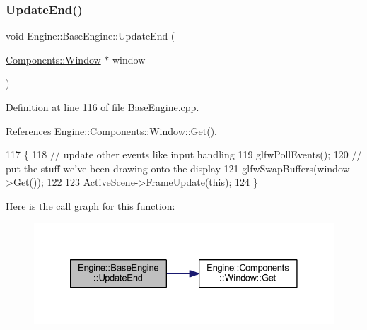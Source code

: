 \mbox{\label{classEngine_1_1BaseEngine_a7c07c98e583df042a0eb01e0ddec85a1}} 
\subsubsection{\texorpdfstring{Update\+End()}{UpdateEnd()}}
{\footnotesize\ttfamily void Engine\+::\+Base\+Engine\+::\+Update\+End (\begin{DoxyParamCaption}\item[{\mbox{\hyperlink{classEngine_1_1Components_1_1Window}{Components\+::\+Window}} $\ast$}]{window }\end{DoxyParamCaption})\hspace{0.3cm}{\ttfamily [virtual]}}



Definition at line 116 of file Base\+Engine.\+cpp.



References Engine\+::\+Components\+::\+Window\+::\+Get().


\begin{DoxyCode}
117 \{
118     \textcolor{comment}{// update other events like input handling}
119     glfwPollEvents();
120     \textcolor{comment}{// put the stuff we’ve been drawing onto the display}
121     glfwSwapBuffers(window->Get());
122 
123     \mbox{\hyperlink{classEngine_1_1BaseEngine_adb3dbc839da9d821e08b18d8a221698d}{ActiveScene}}->\mbox{\hyperlink{classEngine_1_1Components_1_1Scene_abd8fcdcac52dbce6a0a18de3860ab087}{FrameUpdate}}(\textcolor{keyword}{this});
124 \}
\end{DoxyCode}
Here is the call graph for this function\+:
\nopagebreak
\begin{figure}[H]
\begin{center}
\leavevmode
\includegraphics[width=328pt]{classEngine_1_1BaseEngine_a7c07c98e583df042a0eb01e0ddec85a1_cgraph}
\end{center}
\end{figure}
\mbox{\label{classEngine_1_1BaseEngine_aad3c237ca657b9f22f76fccf7fc7561f}} 

